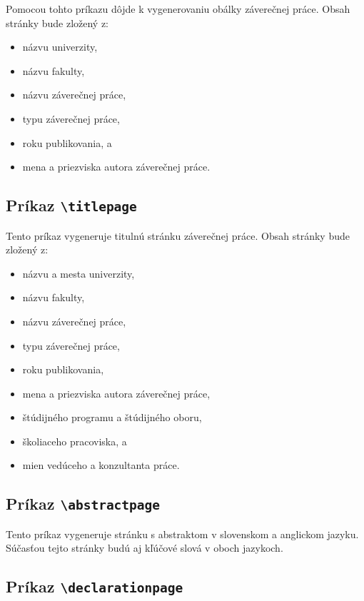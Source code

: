 Pomocou tohto príkazu dôjde k vygenerovaniu obálky záverečnej práce. Obsah stránky bude zložený z:

\begin{itemize}
    \item názvu univerzity,
    \item názvu fakulty,
    \item názvu záverečnej práce,
    \item typu záverečnej práce,
    \item roku publikovania, a
    \item mena a priezviska autora záverečnej práce.
\end{itemize}


\subsection{Príkaz {\tt \textbackslash{}titlepage}}

Tento príkaz vygeneruje titulnú stránku záverečnej práce. Obsah stránky bude zložený z:

\begin{itemize}
    \item názvu a mesta univerzity,
    \item názvu fakulty,
    \item názvu záverečnej práce,
    \item typu záverečnej práce,
    \item roku publikovania,
    \item mena a priezviska autora záverečnej práce,
    \item štúdijného programu a štúdijného oboru,
    \item školiaceho pracoviska, a
    \item mien vedúceho a konzultanta práce.
\end{itemize}


\subsection{Príkaz {\tt \textbackslash{}abstractpage}}

Tento príkaz vygeneruje stránku s abstraktom v slovenskom a anglickom jazyku. Súčasťou tejto stránky budú aj kľúčové slová v oboch jazykoch.


\subsection{Príkaz {\tt \textbackslash{}declarationpage}}

